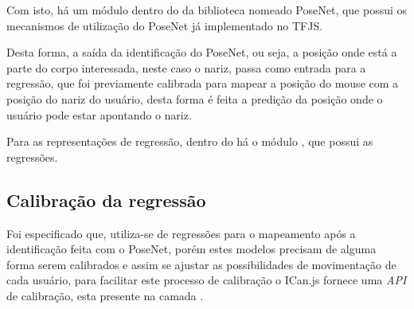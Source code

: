 \par Com isto, há um módulo dentro do  da biblioteca nomeado PoseNet, que possui os mecanismos de utilização do PoseNet já implementado no TFJS. 

\par Desta forma, a saída da identificação do PoseNet, ou seja, a posição onde está a parte do corpo interessada, neste caso o nariz, passa como entrada para a regressão, que foi previamente calibrada para mapear a posição do mouse com a posição do nariz do usuário, desta forma é feita a predição da posição onde o usuário pode estar apontando o nariz.

\par Para as representações de regressão, dentro do  há o módulo , que possui as regressões.


\subsection{Calibração da regressão}

\par Foi especificado que, utiliza-se de regressões para o mapeamento após a identificação feita com o PoseNet, porém estes modelos precisam de alguma forma serem calibrados e assim se ajustar as possibilidades de movimentação de cada usuário, para facilitar este processo de calibração o ICan.js fornece uma \textit{API} de calibração, esta presente na camada .









